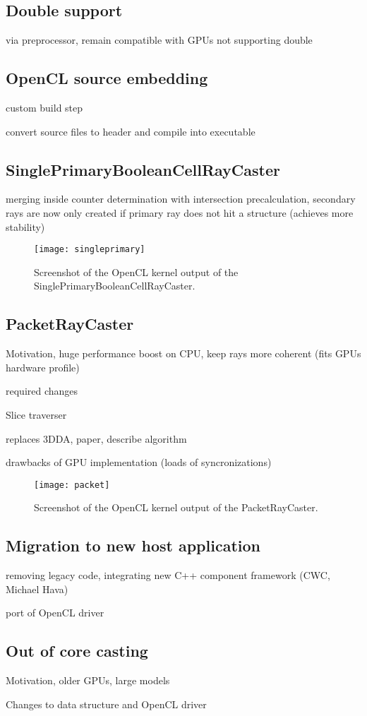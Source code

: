 \subsection{Double support}

via preprocessor, remain compatible with GPUs not supporting double

\subsection{OpenCL source embedding}

custom build step

convert source files to header and compile into executable

\subsection{SinglePrimaryBooleanCellRayCaster}

merging inside counter determination with intersection precalculation, secondary rays are now only created if primary ray does not hit a structure (achieves more stability)

\begin{figure}[h]
\centering
\texttt{[image: singleprimary]}
\caption{Screenshot of the OpenCL kernel output of the SinglePrimaryBooleanCellRayCaster.}
\label{fig:singleprimary}
\end{figure}

\subsection{PacketRayCaster}

Motivation, huge performance boost on CPU, keep rays more coherent (fits GPUs hardware profile)

required changes

Slice traverser

replaces 3DDA, paper, describe algorithm

drawbacks of GPU implementation (loads of syncronizations)

\begin{figure}[h]
\centering
\texttt{[image: packet]}
\caption{Screenshot of the OpenCL kernel output of the PacketRayCaster.}
\label{fig:packet}
\end{figure}

\subsection{Migration to new host application}
\label{sec:migration}

removing legacy code, integrating new C++ component framework (CWC, Michael Hava)

port of OpenCL driver

\subsection{Out of core casting}
\label{sec:out_of_core}

Motivation, older GPUs, large models

Changes to data structure and OpenCL driver

